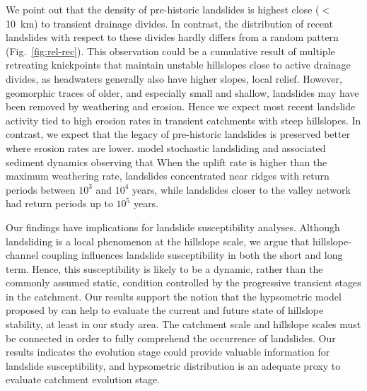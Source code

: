 \documentclass[draft]{agujournal2019}
\begin{document}
\par We point out that the density of pre-historic landslides is highest close ($<$10~km) to transient drainage divides. In contrast, the distribution of recent landslides with respect to these divides hardly differs from a random pattern (Fig.~\ref{fig:rel-rec}). This observation could be a cumulative result of multiple retreating knickpoints that maintain unstable hillslopes close to active drainage divides, as headwaters generally also have higher slopes, local relief. However, geomorphic traces of older, and especially small and shallow, landslides may have been removed by weathering and erosion. Hence we expect most recent landslide activity tied to high erosion rates in transient catchments with steep hillslopes. In contrast, we expect that the legacy of pre-historic landslides is preserved better where erosion rates are lower.  model stochastic landsliding and associated sediment dynamics observing that When the uplift rate is higher than the maximum weathering rate, landslides concentrated near ridges with return periods between $10^3$ and $10^4$ years, while landslides closer to the valley network had return periods up to $10^5$ years.

\par Our findings have implications for landslide susceptibility analyses. Although landsliding is a local phenomenon at the hillslope scale, we argue that hillslope-channel coupling influences landslide susceptibility in both the short and long term. Hence, this susceptibility is likely to be a dynamic, rather than the commonly assumed static, condition controlled by the progressive transient stages in the catchment. Our results support the notion that the hypsometric model proposed by  can help to evaluate the current and future state of hillslope stability, at least in our study area.  The catchment scale and hillslope scales must be connected in order to fully comprehend the occurrence of landslides. Our results indicates the evolution stage could provide valuable information for landslide susceptibility, and hypsometric distribution is an adequate proxy to evaluate catchment evolution stage. 
\end{document}

